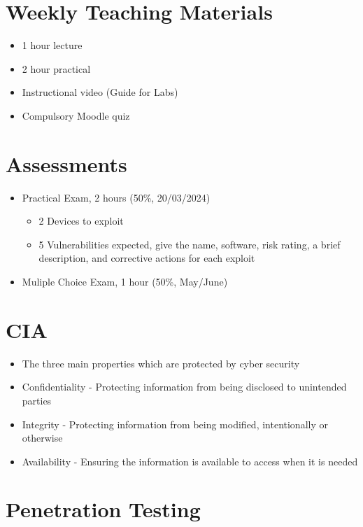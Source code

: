 
\section*{Weekly Teaching Materials}

\begin{itemize}
  \item 1 hour lecture
  \item 2 hour practical
  \item Instructional video (Guide for Labs)
  \item Compulsory Moodle quiz
\end{itemize}

\section*{Assessments}

\begin{itemize}
  \item Practical Exam, 2 hours (50\%, 20/03/2024)
  \begin{itemize}
    \item 2 Devices to exploit
    \item 5 Vulnerabilities expected, give the name, software, risk rating, a brief description, and corrective actions for each exploit
  \end{itemize}
  \item Muliple Choice Exam, 1 hour (50\%, May/June)
\end{itemize}

\section*{CIA}

\begin{itemize}
  \item The three main properties which are protected by cyber security
  \item Confidentiality - Protecting information from being disclosed to unintended parties
  \item Integrity - Protecting information from being modified, intentionally or otherwise
  \item Availability - Ensuring the information is available to access when it is needed
\end{itemize}

\section*{Penetration Testing}

